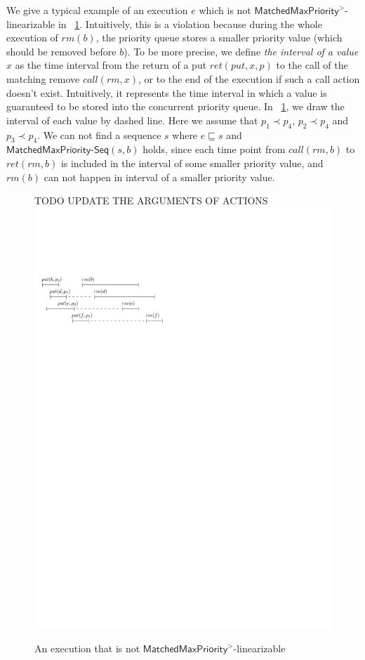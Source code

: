 We give a typical example of an execution $e$ which is not $\mathsf{MatchedMaxPriority}^>$-linearizable in
\figurename~\ref{fig:introduce gap for EPQ1Lar}. Intuitively, this is a violation because during the whole execution of $\textit{rm}(b)$, the priority queue stores a smaller priority value (which should be removed before $b$). To be more precise, we define \emph{the interval of a value $x$} as the time interval from the return of a put $\textit{ret}(\textit{put},x,p)$ to the call of the matching remove $\textit{call}(rm,x)$, or to the end of the execution if such a call action doesn't exist. Intuitively, it represents the time interval in which a value is guaranteed to be stored into the concurrent priority queue.
In \figurename~\ref{fig:introduce gap for EPQ1Lar}, we draw the interval of each value by dashed line. Here we assume that $p_1 \prec p_4$, $p_2 \prec p_4$ and $p_3 \prec p_4$. We can not find a sequence $s$ where $e \sqsubseteq s$ and $\mathsf{MatchedMaxPriority}\mathsf{\text{-}Seq}(s,b)$ holds, since each time point from $\textit{call}(\textit{rm},b)$ to $\textit{ret}(\textit{rm},b)$ is included in the interval of some smaller priority value, and $\textit{rm}(b)$ can not happen in interval of a smaller priority value.

\begin{figure}[htbp]
TODO UPDATE THE ARGUMENTS OF ACTIONS
  \centering
  \includegraphics[width=0.4 \textwidth]{figures/PIC-HIS-INTRO-GAP-EPQ1L.pdf}
  \caption{An execution that is not $\mathsf{MatchedMaxPriority}^{>}$-linearizable}
  \label{fig:introduce gap for EPQ1Lar}
\end{figure}

